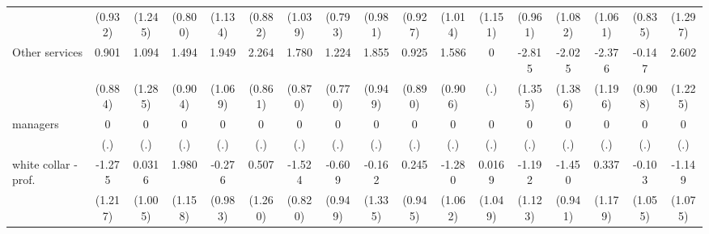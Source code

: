 {\begin{tabular}{l*{16}{c}}
                    &     (0.932)         &     (1.245)         &     (0.800)         &     (1.134)         &     (0.882)         &     (1.039)         &     (0.793)         &     (0.981)         &     (0.927)         &     (1.014)         &     (1.151)         &     (0.961)         &     (1.082)         &     (1.061)         &     (0.835)         &     (1.297)         \\
[1em]
Other services      &       0.901         &       1.094         &       1.494         &       1.949         &       2.264\sym{**} &       1.780\sym{*}  &       1.224         &       1.855         &       0.925         &       1.586         &           0         &      -2.815\sym{*}  &      -2.025         &      -2.376\sym{*}  &      -0.147         &       2.602\sym{*}  \\
                    &     (0.884)         &     (1.285)         &     (0.904)         &     (1.069)         &     (0.861)         &     (0.870)         &     (0.770)         &     (0.949)         &     (0.890)         &     (0.906)         &         (.)         &     (1.355)         &     (1.386)         &     (1.196)         &     (0.908)         &     (1.225)         \\
[1em]
managers            &           0         &           0         &           0         &           0         &           0         &           0         &           0         &           0         &           0         &           0         &           0         &           0         &           0         &           0         &           0         &           0         \\
                    &         (.)         &         (.)         &         (.)         &         (.)         &         (.)         &         (.)         &         (.)         &         (.)         &         (.)         &         (.)         &         (.)         &         (.)         &         (.)         &         (.)         &         (.)         &         (.)         \\
[1em]
white collar - prof.&      -1.275         &      0.0316         &       1.980         &      -0.276         &       0.507         &      -1.524         &      -0.609         &      -0.162         &       0.245         &      -1.280         &      0.0169         &      -1.192         &      -1.450         &       0.337         &      -0.103         &      -1.149         \\
                    &     (1.217)         &     (1.005)         &     (1.158)         &     (0.983)         &     (1.260)         &     (0.820)         &     (0.949)         &     (1.335)         &     (0.945)         &     (1.062)         &     (1.049)         &     (1.123)         &     (0.941)         &     (1.179)         &     (1.055)         &     (1.075)         \\

\end{tabular}}
